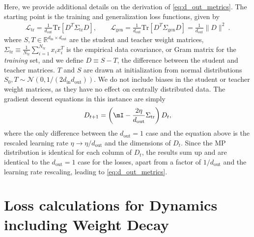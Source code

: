 \documentclass[a4paper,11pt]{article}
\def\tr{\textrm{Tr}}
\newcommand{\norm}[1]{\| #1 \|}
\newcommand{\dout}{d_\mathrm{out}}
\newcommand{\din}{d_\mathrm{in}}
\newcommand{\training}{\mathrm{tr}}
\newcommand{\gen}{\mathrm{gen}}
\begin{document}
Here, we provide additional details on the derivation of \cref{eq:d_out_metrics}.
The starting point is the training and generalization loss functions, given by
\begin{align}
    \mathcal{L}_\training
    =
    \frac{1}{\dout}
    \tr
    \left[
    D^T \Sigma_\training D 
    \right]
    ,
    \qquad
    \mathcal{L}_\gen 
    =\frac{1}{\dout}
    \tr\left[ 
    D^T \Sigma_\gen D 
    \right]
    = \frac{1}{\dout}\norm{D}^2 
    \ .
\end{align}
where $S,T \in \mathbb{R}^{\din\times \dout}$ are the student and teacher weight matrices, $\Sigma_\training \equiv \frac{1}{N_\training}  \sum_{i=1}^{N_\training} x_ix^T_i$ is the empirical data covariance, or Gram matrix for the {\it training} set, and we define $D\equiv S-T$, the difference between the student and teacher matrices.  $T$ and $S$ are drawn at initialization from normal distributions~$S_0, T \sim \mathcal{N}(0,1/({2 \din }\dout))$. We do not include biases in the student or teacher weight matrices, as they have no effect on centrally distributed data.
The gradient descent equations in this instance are simply
\begin{align}
\label{eq:app_dout_GD}
    {D}_{t+1}
    =
     \left( \mI  - \frac{2\eta}{d_\mathrm{out}} \Sigma_\training  \right) D_t ,
\end{align}
where the only difference between the $\dout=1$ case and the equation above is the rescaled learning rate $\eta \to \eta/\dout$ and the dimensions of $D_t$. Since the MP distribution is identical for each column of $D_t$, the results sum up and are identical to the $\dout=1$ case for the losses, apart from a factor of $1/\dout$ and the learning rate rescaling, leading to \cref{eq:d_out_metrics}.










\section{Loss calculations for Dynamics including Weight Decay }
\label{sec:app_WD_derivation}
\end{document}

